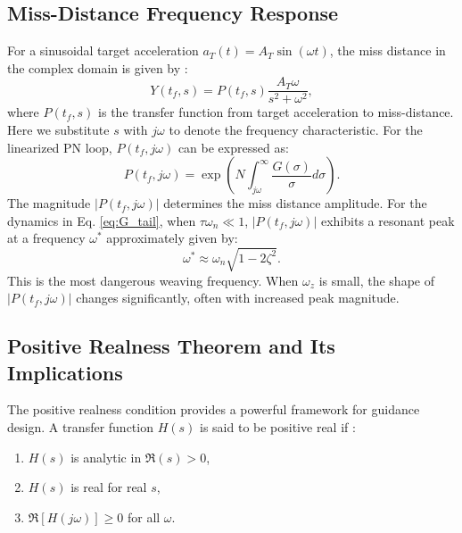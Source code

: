 \documentclass[11pt,a4paper]{article}
\begin{document}
\subsection{Miss-Distance Frequency Response}
For a sinusoidal target acceleration $a_T(t)=A_T\sin(\omega t)$, the miss distance in the complex domain is given by \cite{Yanushevsky2007}:
\begin{equation}
Y(t_f,s) = P(t_f,s) \frac{A_T\omega}{s^2+\omega^2},
\end{equation}
where $P(t_f,s)$ is the transfer function from target acceleration to miss-distance. Here we substitute $s$  with $j\omega$ to denote the frequency characteristic. For the linearized PN loop, $P(t_f,j\omega)$ can be expressed as:
\begin{equation}
P(t_f,j\omega) = \exp\left( N \int_{j\omega}^{\infty} \frac{G(\sigma)}{\sigma} d\sigma \right).
\label{eq:P_integral}
\end{equation}
The magnitude $|P(t_f,j\omega)|$ determines the miss distance amplitude. For the dynamics in Eq. \eqref{eq:G_tail}, when $\tau\omega_n\ll1$, $|P(t_f,j\omega)|$ exhibits a resonant peak at a frequency $\omega^*$ approximately given by:
\begin{equation}
\omega^* \approx \omega_n \sqrt{1 - 2\zeta^2}.
\label{eq:omega_star}
\end{equation}
This is the most dangerous weaving frequency. When $\omega_z$ is small, the shape of $|P(t_f,j\omega)|$ changes significantly, often with increased peak magnitude.

\subsection{Positive Realness Theorem and Its Implications}
The positive realness condition provides a powerful framework for guidance design. A transfer function $H(s)$ is said to be positive real if \cite{Gurfil1998_11}:
\begin{enumerate}
    \item $H(s)$ is analytic in $\Re(s) > 0$,
    \item $H(s)$ is real for real $s$,
    \item $\Re[H(j\omega)] \geq 0$ for all $\omega$.
\end{enumerate}
\end{document}

